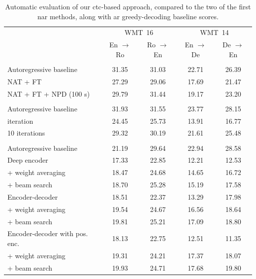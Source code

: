 \begin{table}
  \centering
  \begin{tabular}{lcccc}
    \toprule
     & \multicolumn{2}{c}{WMT~16} & \multicolumn{2}{c}{WMT~14} \\
     & En $\rightarrow$ Ro & Ro $\rightarrow$ En & En $\rightarrow$ De & De $\rightarrow$ En \\
    \midrule
    \citet{gu2017nonautoregressive} & & & & \\
    Autoregressive baseline & 31.35 & 31.03 & 22.71 & 26.39 \\
    \addlinespace
    NAT + FT & 27.29 & 29.06 & 17.69 & 21.47 \\
    NAT + FT + NPD (100 s) & 29.79 & 31.44 & 19.17 & 23.20 \\
    \midrule
    \citet{lee-etal-2018-deterministic} & & & & \\
    Autoregressive baseline & 31.93 & 31.55  & 23.77 & 28.15 \\
    \addlinespace
    1 iteration & 24.45 & 25.73 & 13.91 & 16.77 \\
    10 iterations & 29.32 & 30.19 & 21.61 & 25.48 \\
    \midrule
    \citet{libovicky-helcl-2018-end} & & & & \\
    Autoregressive baseline & 21.19 & 29.64 & 22.94 & 28.58 \\
    \addlinespace
    Deep encoder & 17.33 & 22.85 & 12.21 & 12.53 \\
    \quad + weight averaging & 18.47 & 24.68 & 14.65 & 16.72 \\
    \quad + beam search & 18.70 & 25.28 & 15.19 & 17.58 \\
    \addlinespace
    Encoder-decoder  & 18.51 & 22.37 & 13.29 & 17.98 \\
    \quad + weight averaging & 19.54 & 24.67 & 16.56 & 18.64 \\
    \quad + beam search & 19.81 & 25.21 & 17.09 & 18.80  \\
    \addlinespace
    Encoder-decoder with pos. enc. & 18.13 & 22.75 & 12.51 & 11.35 \\
    \quad + weight averaging & 19.31 & 24.21 & 17.37 & 18.07 \\
    \quad + beam search & 19.93 & 24.71 & 17.68 & 19.80 \\
    \bottomrule
  \end{tabular}

  \caption{Automatic evaluation of our \acs{ctc}-based approach, compared to
    the two of the first \acl{nar} methods, along with \acl{ar} greedy-decoding
    baseline scores. }%
  \label{tab:end-to-end:bleu}
\end{table}


